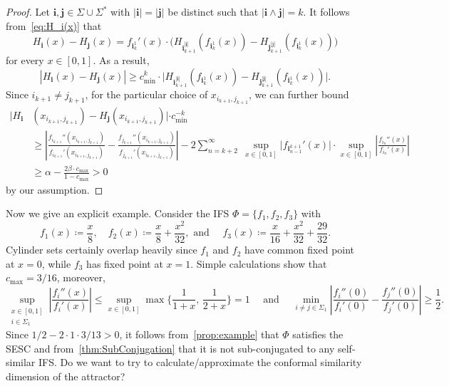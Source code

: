 \documentclass[12pt,]{article}
\theoremstyle{definition}
\theoremstyle{remark}
\newcommand{\0}{\mathbf{0}}
\newcommand{\bi}{\mathbf{i}}
\newcommand{\bj}{\mathbf{j}}
\begin{document}
{\begin{proof}
Let $\bi,\bj \in\Sigma\cup\Sigma^*$ with $|\bi|=|\bj|$ be distinct such that $|\bi\wedge \bj|=k$. It follows from~\cref{eq:H_i(x)} that
\begin{equation*}
H_{\bi}(x)-H_{\bj}(x) = f_{\bi_k^1}'(x)\cdot \big( H_{\bi_{k+1}^{|\bi|}}(f_{\bi_k^1}(x)) - H_{\bj_{k+1}^{|\bj|}}(f_{\bi_k^1}(x)) \big)
\end{equation*}
for every $x\in[0,1]$. As a result,
\begin{equation*}
|H_{\bi}(x)-H_{\bj}(x)| \geq c_{\min}^k\cdot \big| H_{\bi_{k+1}^{|\bi|}}(f_{\bi_k^1}(x)) - H_{\bj_{k+1}^{|\bj|}}(f_{\bi_k^1}(x)) \big|.
\end{equation*}
Since $i_{k+1}\neq j_{k+1}$, for the particular choice of $x_{i_{k+1},j_{k+1}}$, we can further bound 
\begin{align*}
|H_{\bi}&(x_{i_{k+1},j_{k+1}}) - H_{\bj}(x_{i_{k+1},j_{k+1}})|\cdot c_{\min}^{-k} \\
&\geq \left| \frac{f_{i_{k+1}}''(x_{i_{k+1},j_{k+1}})}{f_{i_{k+1}}'(x_{i_{k+1},j_{k+1}})} - \frac{f_{j_{k+1}}''(x_{i_{k+1},j_{k+1}})}{f_{j_{k+1}}'(x_{i_{k+1},j_{k+1}})} \right| - 2 \sum_{n=k+2}^{\infty}\; \sup_{x\in[0,1]} \big| f_{\bi_{n-1}^{k+1}}'(x) \big| \cdot \sup_{x\in[0,1]} \left| \frac{f_{i_n}''(x)}{f_{i_n}'(x)} \right| \\
&\geq \alpha -  \frac{2\beta\cdot c_{\max}}{1-c_{\max}} >0
\end{align*}
by our assumption.
\end{proof}

Now we give an explicit example. Consider the IFS $\Phi=\{f_1,f_2,f_3\}$ with
\begin{equation*}
f_1(x)\coloneqq \frac{x}{8}, \quad f_2(x)\coloneqq \frac{x}{8} + \frac{x^2}{32}, \text{ and } \quad f_3(x)\coloneqq \frac{x}{16} + \frac{x^2}{32} + \frac{29}{32}. 
\end{equation*}
Cylinder sets certainly overlap heavily since $f_1$ and $f_2$ have common fixed point at $x=0$, while $f_3$ has fixed point at $x=1$. Simple calculations show that $c_{\max}=3/16$, moreover,
\begin{equation*}
\sup_{\substack{x\in[0,1] \\ i\in\Sigma_1}} \left| \frac{f_i''(x)}{f_i'(x)} \right| \leq  \sup_{x\in[0,1]} \max\Big\{\frac{1}{1+x},\, \frac{1}{2+x} \Big\} = 1 \quad\text{ and }\quad \min_{i\neq j\in\Sigma_1}\left| \frac{f_i''(0)}{f_i'(0)} - \frac{f_j''(0)}{f_j'(0)} \right| \geq \frac{1}{2} .
\end{equation*}
Since $1/2-2\cdot 1\cdot 3/13>0$, it follows from~\cref{prop:example} that $\Phi$ satisfies the SESC and from~\cref{thm:SubConjugation} that it is not sub-conjugated to any self-similar IFS. {\color{red} Do we want to try to calculate/approximate the conformal similarity dimension of the attractor?}


}
\end{document}
